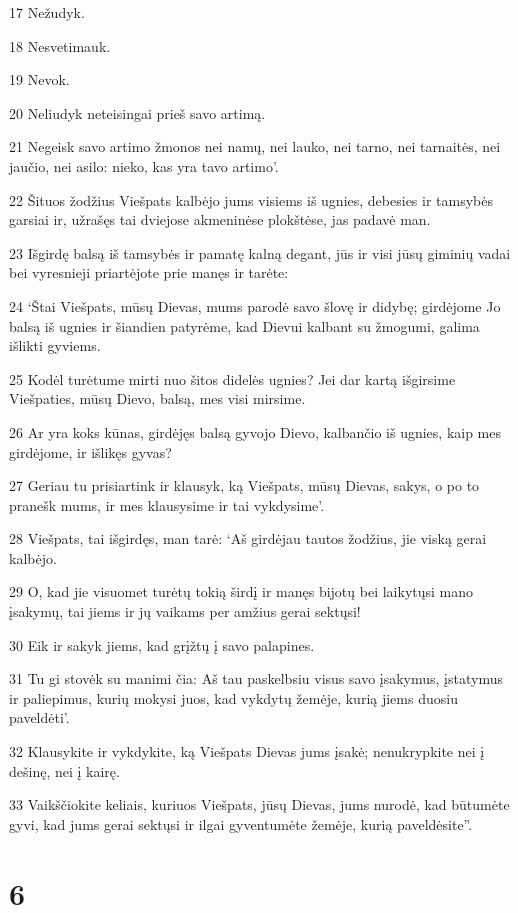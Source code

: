 \par 17 Nežudyk. 
\par 18 Nesvetimauk. 
\par 19 Nevok. 
\par 20 Neliudyk neteisingai prieš savo artimą. 
\par 21 Negeisk savo artimo žmonos nei namų, nei lauko, nei tarno, nei tarnaitės, nei jaučio, nei asilo: nieko, kas yra tavo artimo’. 
\par 22 Šituos žodžius Viešpats kalbėjo jums visiems iš ugnies, debesies ir tamsybės garsiai ir, užrašęs tai dviejose akmeninėse plokštėse, jas padavė man. 
\par 23 Išgirdę balsą iš tamsybės ir pamatę kalną degant, jūs ir visi jūsų giminių vadai bei vyresnieji priartėjote prie manęs ir tarėte: 
\par 24 ‘Štai Viešpats, mūsų Dievas, mums parodė savo šlovę ir didybę; girdėjome Jo balsą iš ugnies ir šiandien patyrėme, kad Dievui kalbant su žmogumi, galima išlikti gyviems. 
\par 25 Kodėl turėtume mirti nuo šitos didelės ugnies? Jei dar kartą išgirsime Viešpaties, mūsų Dievo, balsą, mes visi mirsime. 
\par 26 Ar yra koks kūnas, girdėjęs balsą gyvojo Dievo, kalbančio iš ugnies, kaip mes girdėjome, ir išlikęs gyvas? 
\par 27 Geriau tu prisiartink ir klausyk, ką Viešpats, mūsų Dievas, sakys, o po to pranešk mums, ir mes klausysime ir tai vykdysime’. 
\par 28 Viešpats, tai išgirdęs, man tarė: ‘Aš girdėjau tautos žodžius, jie viską gerai kalbėjo. 
\par 29 O, kad jie visuomet turėtų tokią širdį ir manęs bijotų bei laikytųsi mano įsakymų, tai jiems ir jų vaikams per amžius gerai sektųsi! 
\par 30 Eik ir sakyk jiems, kad grįžtų į savo palapines. 
\par 31 Tu gi stovėk su manimi čia: Aš tau paskelbsiu visus savo įsakymus, įstatymus ir paliepimus, kurių mokysi juos, kad vykdytų žemėje, kurią jiems duosiu paveldėti’. 
\par 32 Klausykite ir vykdykite, ką Viešpats Dievas jums įsakė; nenukrypkite nei į dešinę, nei į kairę. 
\par 33 Vaikščiokite keliais, kuriuos Viešpats, jūsų Dievas, jums nurodė, kad būtumėte gyvi, kad jums gerai sektųsi ir ilgai gyventumėte žemėje, kurią paveldėsite”.



\chapter{6}


